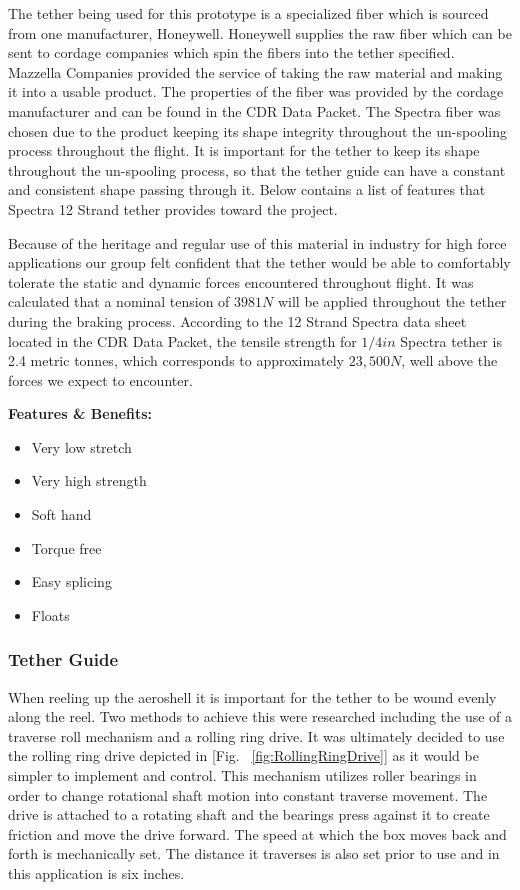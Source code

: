 \indent\indent The tether being used for this prototype is a specialized fiber which is sourced from one manufacturer, Honeywell. Honeywell supplies the raw fiber which can be sent to cordage companies which spin the fibers into the tether specified. Mazzella Companies provided the service of taking the raw material and making it into a usable product. The properties of the fiber was provided by the cordage manufacturer and can be found in the CDR Data Packet. The Spectra fiber was chosen due to the product keeping its shape integrity throughout the un-spooling process throughout the flight. It is important for the tether to keep its shape throughout the un-spooling process, so that the tether guide can have a constant and consistent shape passing through it. Below contains a list of features that Spectra 12 Strand tether provides toward the project.

\indent\indent Because of the heritage and regular use of this material in industry for high force applications our group felt confident that the tether would be able to comfortably tolerate the static and dynamic forces encountered throughout flight. It was calculated that a nominal tension of $3981 N$ will be applied throughout the tether during the braking process. According to the 12 Strand Spectra data sheet located in the CDR Data Packet, the tensile strength for $1/4 in$ Spectra tether is 2.4 metric tonnes, which corresponds to approximately $23,500 N$, well above the forces we expect to encounter. 

\textbf{Features \& Benefits:}

\begin{itemize}[noitemsep]
  \item Very low stretch
  \item Very high strength
  \item Soft hand
  \item Torque free
  \item Easy splicing
  \item Floats
\end{itemize}

\subsubsection{Tether Guide}

\indent\indent When reeling up the aeroshell it is important for the tether to be wound evenly along the reel. Two methods to achieve this were researched including the use of a traverse roll mechanism and a rolling ring drive. It was ultimately decided to use the rolling ring drive depicted in [Fig. ~\ref{fig:RollingRingDrive}] as it would be simpler to implement and control. This mechanism utilizes roller bearings in order to change rotational shaft motion into constant traverse movement. The drive is attached to a rotating shaft and the bearings press against it to create friction and move the drive forward. The speed at which the box moves back and forth is mechanically set. The distance it traverses is also set prior to use and in this application is six inches. 

